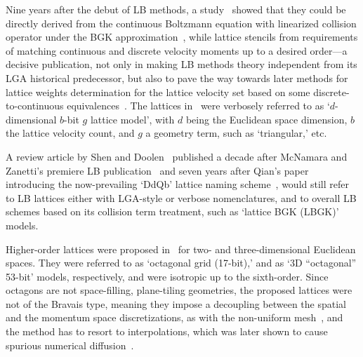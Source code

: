     Nine years after the debut of LB methods, a study~\cite{1997-HeX+LuoLS-PhysRevE} showed that they could be directly  derived
    from    the    continuous    Boltzmann    equation    with    linearized    collision     operator     under     the     BGK
    approximation~\cite{2011-HarrisS-Dover}, while lattice stencils  from  requirements  of  matching  continuous  and  discrete
    velocity moments up to a desired order---a decisive publication, not only in making LB methods theory independent  from  its
    LGA historical predecessor, but also to pave the way towards later methods for lattice weights determination for the lattice
    velocity     set     based     on      some      discrete-to-continuous      equivalences~\cite{2006-ShanX+ChenH-JFluidMech,
    2006-PhilippiPC+SurmasR-PhysRevE}.  The  lattices  in~\cite{1997-HeX+LuoLS-PhysRevE}   were   verbosely   referred   to   as
    `$d$-dimensional $b$-bit $g$ lattice model', with $d$ being the Euclidean space dimension, $b$ the lattice  velocity  count,
    and $g$ a geometry term, such as `triangular,' etc.

    A review article by Shen and  Doolen~\cite{1998-ChenS+DoolenGD-AnnuRevFluidMech}  published  a  decade  after  McNamara  and
    Zanetti's premiere LB publication~\cite{1988-McNamaraGR+ZanettiG-PhysRevLett} and seven years after Qian's paper introducing
    the now-prevailing `DdQb' lattice naming scheme~\cite{1991-QianYH+LallemandP-AdvKinTheoContMech}, would still  refer  to  LB
    lattices either with LGA-style or verbose nomenclatures, and to overall LB schemes based on its  collision  term  treatment,
    such    as    `lattice    BGK    (LBGK)'    models.

    Higher-order lattices were proposed  in~\cite{1998-PavloP+VahalaL-PhysRevLett}  for  two-  and  three-dimensional  Euclidean
    spaces. They were referred to as `octagonal grid (17-bit),' and as `3D ``octagonal'' 53-bit' models, respectively, and  were
    isotropic up to the sixth-order. Since octagons are not space-filling, plane-tiling geometries, the proposed  lattices  were
    not of the Bravais type, meaning they impose a decoupling between the spatial and the  momentum  space  discretizations,  as
    with the non-uniform mesh~\cite{1996-HeX+DemboM-JComputPhys}, and the method has to  resort  to  interpolations,  which  was
    later shown to cause spurious numerical diffusion~\cite[p.~429]{2006-ShanX+ChenH-JFluidMech}.

